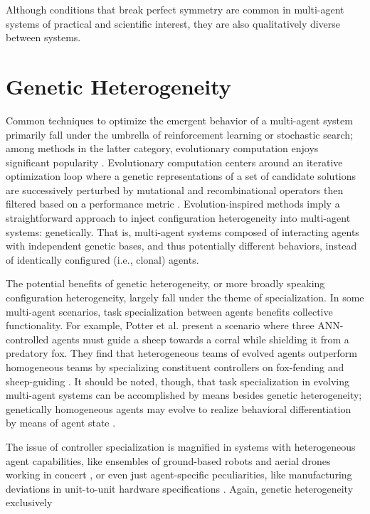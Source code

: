 Although conditions that break perfect symmetry are common in multi-agent systems of practical and scientific interest, they are also qualitatively diverse between systems.

\section{Genetic Heterogeneity}

Common techniques to optimize the emergent behavior of a multi-agent system primarily fall under the umbrella of reinforcement learning or stochastic search; among methods in the latter category, evolutionary computation enjoys significant popularity \cite{panait2005cooperative}.
Evolutionary computation centers around an iterative optimization loop where a genetic representations of a set of candidate solutions are successively perturbed by mutational and recombinational operators then filtered based on a performance metric \cite{fogel2000evolutionary}.
Evolution-inspired methods imply a straightforward approach to inject configuration heterogeneity into multi-agent systems: genetically.
That is, multi-agent systems composed of interacting agents with independent genetic bases, and thus potentially different behaviors, instead of identically configured (i.e., clonal) agents.

The potential benefits of genetic heterogeneity, or more broadly speaking configuration heterogeneity, largely fall under the theme of specialization.
In some multi-agent scenarios, task specialization between agents benefits collective functionality.
For example, Potter et al. present a scenario where three ANN-controlled agents must guide a sheep towards a corral while shielding it from a predatory fox.
They find that heterogeneous teams of evolved agents outperform homogeneous teams by specializing constituent controllers on fox-fending and sheep-guiding \cite{potter2001heterogeneity}.
It should be noted, though, that task specialization in evolving multi-agent systems can be accomplished by means besides genetic heterogeneity;
genetically homogeneous agents may evolve to realize behavioral differentiation by means of agent state \cite{ferrante2015evolution}.

The issue of controller specialization is magnified in systems with heterogeneous agent capabilities, like ensembles of ground-based robots and aerial drones working in concert \cite{gomes2015cooperative, mathews2012supervised}, or even just agent-specific peculiarities, like manufacturing deviations in unit-to-unit hardware specifications \cite{pugh2007parallel, duarte2016evolution}.
Again, genetic heterogeneity exclusively
\cite{tuci2008evolving}


